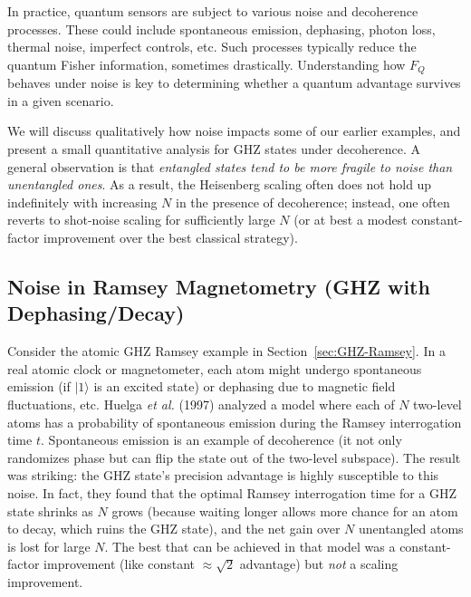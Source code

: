 \label{sec:noise}



In practice, quantum sensors are subject to various noise and
decoherence processes. These could include spontaneous emission,
dephasing, photon loss, thermal noise, imperfect controls, etc. Such
processes typically reduce the quantum Fisher information, sometimes
drastically. Understanding how $F_Q$ behaves under noise is key to
determining whether a quantum advantage survives in a given scenario.



We will discuss qualitatively how noise impacts some of our earlier
examples, and present a small quantitative analysis for GHZ states
under decoherence. A general observation is that \emph{entangled
states tend to be more fragile to noise than unentangled ones}. As a
result, the Heisenberg scaling often does not hold up indefinitely
with increasing $N$ in the presence of decoherence; instead, one often
reverts to shot-noise scaling for sufficiently large $N$ (or at best a
modest constant-factor improvement over the best classical strategy).



\subsection{Noise in Ramsey Magnetometry (GHZ with Dephasing/Decay)}



Consider the atomic GHZ Ramsey example in
Section~\ref{sec:GHZ-Ramsey}. In a real atomic clock or magnetometer,
each atom might undergo spontaneous emission (if $|1\rangle$ is an
excited state) or dephasing due to magnetic field fluctuations,
etc. Huelga \textit{et al.} (1997) \cite{Huelga1997} analyzed a model
where each of $N$ two-level atoms has a probability of spontaneous
emission during the Ramsey interrogation time $t$. Spontaneous
emission is an example of decoherence (it not only randomizes phase
but can flip the state out of the two-level subspace). The result was
striking: the GHZ state’s precision advantage is highly susceptible to
this noise. In fact, they found that the optimal Ramsey interrogation
time for a GHZ state shrinks as $N$ grows (because waiting longer
allows more chance for an atom to decay, which ruins the GHZ state),
and the net gain over $N$ unentangled atoms is lost for large $N$. The
best that can be achieved in that model was a constant-factor
improvement (like constant $\approx \sqrt{2}$ advantage) but
\emph{not} a scaling improvement.



